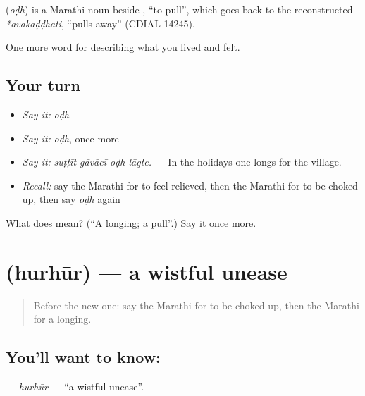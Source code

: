 \begin{cousinweb}
\textbf{} (\emph{oḍh}) is a Marathi noun beside , \textquotedblleft{}to pull\textquotedblright{}, which goes back to the reconstructed \emph{*avakaḍḍhati}, \textquotedblleft{}pulls away\textquotedblright{} (CDIAL 14245).
\end{cousinweb}

\begin{grammarlens}[title={What you've built}]
One more word for describing what you lived and felt.
\end{grammarlens}

\subsection*{Your turn}
\begin{itemize}
\raggedright
  \item \emph{Say it:} \emph{oḍh}
  \item \emph{Say it:} \emph{oḍh}, once more
  \item \emph{Say it:} \emph{suṭṭīt gāvācī oḍh lāgte.} — In the holidays one longs for the village.
  \item \emph{Recall:} say the Marathi for to feel relieved, then the Marathi for to be choked up, then say \emph{oḍh} again
\end{itemize}

\begin{tcolorbox}[breakable,colback=teal!4,colframe=teal!35!black,title={Before you move on}]
What does  mean? (\textquotedblleft{}A longing; a pull\textquotedblright{}.) Say it once more.
\end{tcolorbox}
\section[\texorpdfstring{\mr{हुरहूर} (hurhūr)}{हुरहूर (hurhūr)}]{ (hurhūr) — a wistful unease}

\label{lesson:MR-C459-hurhur}



\begin{quote}
Before the new one: say the Marathi for to be choked up, then the Marathi for a longing.
\end{quote}

\subsection*{You'll want to know: }
\textbf{} — \emph{hurhūr} — \textquotedblleft{}a wistful unease\textquotedblright{}.

